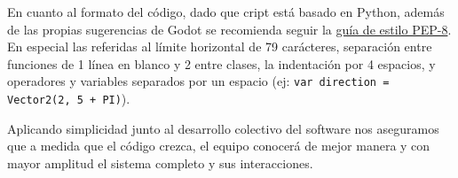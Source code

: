 En cuanto al formato del código, dado que cript está basado en Python, además de las propias sugerencias de Godot se recomienda seguir la \href{https://www.python.org/dev/peps/pep-0008/}{guía de estilo PEP-8}. En especial las referidas al límite horizontal de 79 carácteres, separación entre funciones de 1 línea en blanco y 2 entre clases, la indentación por 4 espacios, y operadores y variables separados por un espacio (ej: {\small \texttt{var direction = Vector2(2, 5 + PI)}}).

Aplicando simplicidad junto al desarrollo colectivo del software nos aseguramos que a medida que el código crezca, el equipo conocerá de mejor manera y con mayor amplitud el sistema completo y sus interacciones.


